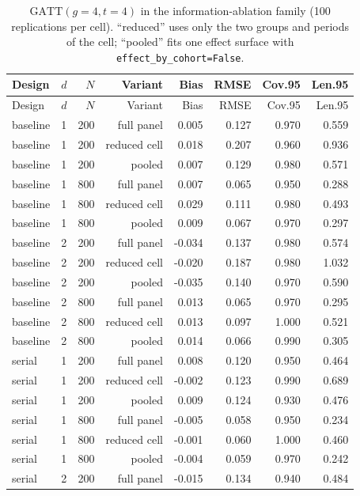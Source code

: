 {\footnotesize
\begin{longtable}{llrrrrrr}
\caption{$\mathrm{GATT}(g{=}4,t{=}4)$ in the information-ablation family (100 replications per cell). ``reduced'' uses only the two groups and periods of the cell; ``pooled'' fits one effect surface with \texttt{effect\_by\_cohort=False}.}\label{tab:infogatt}\\
\toprule
Design & $d$ & $N$ & Variant & Bias & RMSE & Cov.95 & Len.95 \\
\midrule
\endfirsthead
\toprule
Design & $d$ & $N$ & Variant & Bias & RMSE & Cov.95 & Len.95 \\
\midrule
\endhead
\bottomrule
\endlastfoot
baseline & 1 & 200 & full panel & 0.005 & 0.127 & 0.970 & 0.559 \\
baseline & 1 & 200 & reduced cell & 0.018 & 0.207 & 0.960 & 0.936 \\
baseline & 1 & 200 & pooled & 0.007 & 0.129 & 0.980 & 0.571 \\
baseline & 1 & 800 & full panel & 0.007 & 0.065 & 0.950 & 0.288 \\
baseline & 1 & 800 & reduced cell & 0.029 & 0.111 & 0.980 & 0.493 \\
baseline & 1 & 800 & pooled & 0.009 & 0.067 & 0.970 & 0.297 \\
baseline & 2 & 200 & full panel & -0.034 & 0.137 & 0.980 & 0.574 \\
baseline & 2 & 200 & reduced cell & -0.020 & 0.187 & 0.980 & 1.032 \\
baseline & 2 & 200 & pooled & -0.035 & 0.140 & 0.970 & 0.590 \\
baseline & 2 & 800 & full panel & 0.013 & 0.065 & 0.970 & 0.295 \\
baseline & 2 & 800 & reduced cell & 0.013 & 0.097 & 1.000 & 0.521 \\
baseline & 2 & 800 & pooled & 0.014 & 0.066 & 0.990 & 0.305 \\
serial & 1 & 200 & full panel & 0.008 & 0.120 & 0.950 & 0.464 \\
serial & 1 & 200 & reduced cell & -0.002 & 0.123 & 0.990 & 0.689 \\
serial & 1 & 200 & pooled & 0.009 & 0.124 & 0.930 & 0.476 \\
serial & 1 & 800 & full panel & -0.005 & 0.058 & 0.950 & 0.234 \\
serial & 1 & 800 & reduced cell & -0.001 & 0.060 & 1.000 & 0.460 \\
serial & 1 & 800 & pooled & -0.004 & 0.059 & 0.970 & 0.242 \\
serial & 2 & 200 & full panel & -0.015 & 0.134 & 0.940 & 0.484 \\

\end{longtable}}
